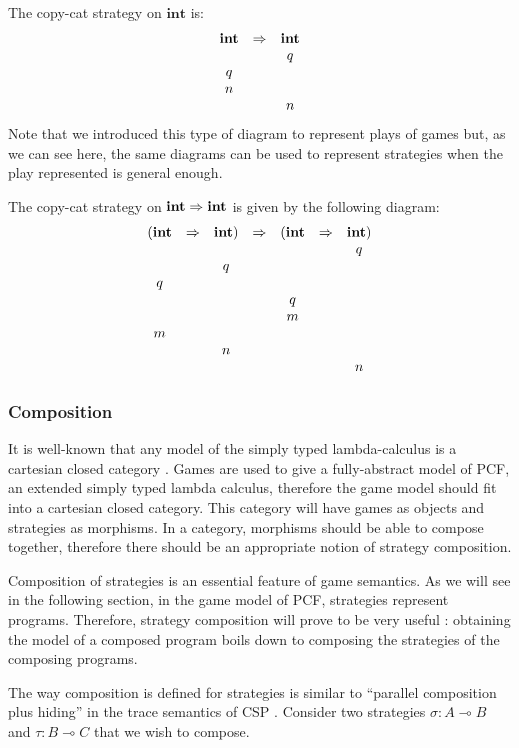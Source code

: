 \begin{exmp} The copy-cat strategy on $\textbf{int}$ is:
$$\begin{array}{ccc}
\textbf{int} & \Rightarrow & \textbf{int} \\
&& q\\
q \\
n \\
&& n
\end{array}
$$
Note that we introduced this type of diagram to represent plays of
games but, as we can see here, the same diagrams can be used to
represent strategies when the play represented is general enough.

The copy-cat strategy on $\textbf{int} \Rightarrow \textbf{int}$ is given
by the following diagram:
$$\begin{array}{ccccccc}
(\textbf{int} & \Rightarrow & \textbf{int}) & \Rightarrow & (\textbf{int} & \Rightarrow & \textbf{int}) \\
&&&& && q\\
&& q\\
q \\
&&&& q \\
&&&& m \\
m\\
&& n \\
&&&& && n
\end{array}$$
\end{exmp}

\subsubsection{Composition}

It is well-known that any model of the simply typed lambda-calculus
is a cartesian closed category \citep{CroleRL:catt}. Games are used
to give a fully-abstract model of PCF, an extended simply typed
lambda calculus, therefore the game model should fit into a
cartesian closed category. This category will have games as objects
and strategies as morphisms. In a category, morphisms should be able
to compose together, therefore there should be an appropriate notion
of strategy composition.

Composition of strategies is an essential feature of game semantics.
As we will see in the following section, in the game model of PCF,
strategies represent programs. Therefore, strategy composition will
prove to be very useful : obtaining the model of a composed program
boils down to composing the strategies of the composing programs.

The way composition is defined for strategies is similar to
``parallel composition plus hiding'' in the trace semantics of CSP
\citep{hoare_csp}. Consider two strategies $\sigma : A \multimap B$
and $\tau : B \multimap C$ that we wish to compose.


